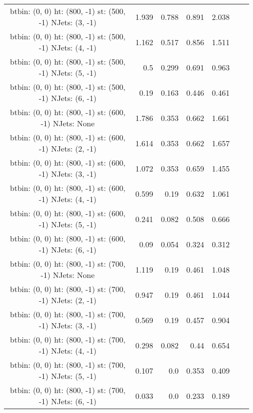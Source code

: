 \documentclass[12pt]{paper}
\begin{document}
\begin{landscape}
\begin{longtable}{c|r|r|r|r|r|r}
btbin:  (0, 0) ht:  (800, -1) st:  (500, -1) NJets:  (3, -1)
 & 1.939 & 0.788 & 0.891 & 2.038\\
btbin:  (0, 0) ht:  (800, -1) st:  (500, -1) NJets:  (4, -1)
 & 1.162 & 0.517 & 0.856 & 1.511\\
btbin:  (0, 0) ht:  (800, -1) st:  (500, -1) NJets:  (5, -1)
 & 0.5 & 0.299 & 0.691 & 0.963\\
btbin:  (0, 0) ht:  (800, -1) st:  (500, -1) NJets:  (6, -1)
 & 0.19 & 0.163 & 0.446 & 0.461\\
btbin:  (0, 0) ht:  (800, -1) st:  (600, -1) NJets:  None
 & 1.786 & 0.353 & 0.662 & 1.661\\
btbin:  (0, 0) ht:  (800, -1) st:  (600, -1) NJets:  (2, -1)
 & 1.614 & 0.353 & 0.662 & 1.657\\
btbin:  (0, 0) ht:  (800, -1) st:  (600, -1) NJets:  (3, -1)
 & 1.072 & 0.353 & 0.659 & 1.455\\
btbin:  (0, 0) ht:  (800, -1) st:  (600, -1) NJets:  (4, -1)
 & 0.599 & 0.19 & 0.632 & 1.061\\
btbin:  (0, 0) ht:  (800, -1) st:  (600, -1) NJets:  (5, -1)
 & 0.241 & 0.082 & 0.508 & 0.666\\
btbin:  (0, 0) ht:  (800, -1) st:  (600, -1) NJets:  (6, -1)
 & 0.09 & 0.054 & 0.324 & 0.312\\
btbin:  (0, 0) ht:  (800, -1) st:  (700, -1) NJets:  None
 & 1.119 & 0.19 & 0.461 & 1.048\\
btbin:  (0, 0) ht:  (800, -1) st:  (700, -1) NJets:  (2, -1)
 & 0.947 & 0.19 & 0.461 & 1.044\\
btbin:  (0, 0) ht:  (800, -1) st:  (700, -1) NJets:  (3, -1)
 & 0.569 & 0.19 & 0.457 & 0.904\\
btbin:  (0, 0) ht:  (800, -1) st:  (700, -1) NJets:  (4, -1)
 & 0.298 & 0.082 & 0.44 & 0.654\\
btbin:  (0, 0) ht:  (800, -1) st:  (700, -1) NJets:  (5, -1)
 & 0.107 & 0.0 & 0.353 & 0.409\\
btbin:  (0, 0) ht:  (800, -1) st:  (700, -1) NJets:  (6, -1)
 & 0.033 & 0.0 & 0.233 & 0.189\\
\end{longtable}
\end{landscape}
\end{document}
